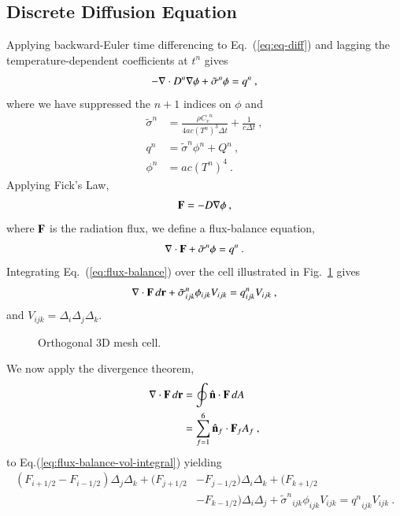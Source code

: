 \documentclass[preprint,12pt]{elsarticle}
\newcommand{\Cv}{\ensuremath{C_{v}}}
\newcommand{\dt}{\ensuremath{\Delta t}}
\newcommand{\sign}{\ensuremath{\tilde{\sigma}^n}}
\newcommand{\qn}{\ensuremath{q^n}} \newcommand{\Tn}{\ensuremath{T^n}}
\newcommand{\Dn}{\ensuremath{D^n}}
\newcommand{\phin}{\ensuremath{\phi^n}}
\newcommand{\Di}{\ensuremath{\Delta_i}}
\newcommand{\Dj}{\ensuremath{\Delta_j}}
\newcommand{\Dk}{\ensuremath{\Delta_k}}
\begin{document}
\subsection{Discrete Diffusion Equation}

Applying backward-Euler time differencing to Eq.~(\ref{eq:eq-diff}) and
lagging the temperature-dependent coefficients at $t^n$ gives
\begin{equation}
  -\nabla\cdot \Dn\grad{\phi} + \sign\phi = \qn\:,
\end{equation}
where we have suppressed the $n+1$ indices on $\phi$ and
\begin{align}
  \sign &= \frac{\rho \Cv^n}{4ac(\Tn)^3\dt} + \frac{1}{c\dt}\:,\\ \qn
  &= \sign\phin + Q^n\:,\\ \phin &= ac(\Tn)^4\:.
\end{align}
Applying Fick's Law,
\begin{equation}
  \mathbf{F} = -D\nabla \phi\:,
  \label{eq:fick}
\end{equation}
where $\mathbf{F}$ is the radiation flux, we define a flux-balance equation,
\begin{equation}
  \dive{F} + \sign\phi = \qn\:.
  \label{eq:flux-balance}
\end{equation}
Integrating Eq.~(\ref{eq:flux-balance}) over the cell illustrated in
Fig.~\ref{fig:cell} gives
\begin{equation}
  \iiint\dive{F}\,d\ve{r} +
  \sign_{ijk}\phi_{ijk}V_{ijk}=\qn_{ijk}V_{ijk}\:,
  \label{eq:flux-balance-vol-integral}
\end{equation}
and $V_{ijk} = \Delta_i\Delta_j\Delta_k$.
\begin{figure}[h!]
  \centerline{ }
  \caption{Orthogonal 3D mesh cell.}
  \label{fig:cell}
\end{figure}
We now apply the divergence theorem,
\begin{equation}
  \begin{split}
    \relax\nabla\cdot\mathbf{F}\,d\mathbf{r} &= \oint\hat{\mathbf{n}}\cdot\mathbf{F}\,dA\\ &=
    \sum_{f=1}^{6}\hat{\mathbf{n}}_f\cdot\mathbf{F}_f A_f\:,
  \end{split}
\end{equation}
to Eq.(\ref{eq:flux-balance-vol-integral}) yielding
\begin{equation}
  \begin{split}
    (F_{i+1/2} - F_{i-1/2})\Dj\Dk + (F_{j+1/2} &- F_{j-1/2})\Di\Dk +
    (F_{k+1/2}\\ &- F_{k-1/2})\Di\Dj + \sign_{ijk}\phi_{ijk}V_{ijk} =
    \qn_{ijk}V_{ijk}\:.
  \end{split}
  \label{eq:flux-balance-difference}
\end{equation}
\end{document}
